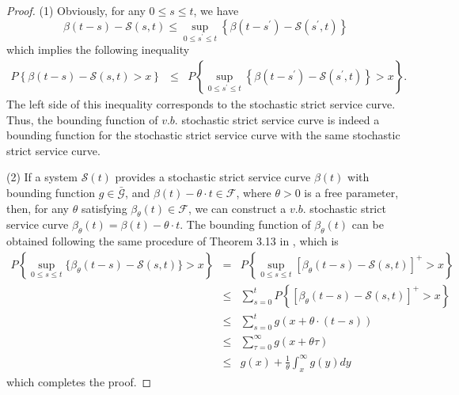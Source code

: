 \documentclass[12pt]{article}
\newtheorem{proof}{Proof}
\begin{document}
\begin{proof}
(1) Obviously, for any $0\leq s\leq t$, we have
$$\beta(t-s)-\mathcal{S}(s,t)\leq \sup_{0\leq s^\prime\leq t}\left\{\beta(t-s^\prime)-\mathcal{S}(s^\prime,t)\right\}$$
which implies the following inequality
\begin{eqnarray*}
P\left\{\beta(t-s)-\mathcal{S}(s,t)>x\right\} &\leq& P\left\{\sup_{0\leq s^\prime\leq t}\left\{\beta(t-s^\prime)-\mathcal{S}(s^\prime,t)\right\}>x\right\}.
\end{eqnarray*}
The left side of this inequality corresponds to the stochastic strict service curve. Thus, the bounding function of $v.b.$ stochastic strict service curve is indeed a bounding function for the stochastic strict service curve with the same stochastic strict service curve.

(2) If a system $\mathcal{S}(t)$ provides a stochastic strict service curve $\beta(t)$ with bounding function $g\in\bar{\mathcal{G}}$, and $\beta(t)-\theta \cdot t\in\mathcal{F}$, where $\theta>0$ is a free parameter, then, for any $\theta$ satisfying $\beta_{\theta}(t)\in\mathcal{F}$, we can construct a $v.b.$ stochastic strict service curve $\beta_{\theta}(t)=\beta(t)-\theta \cdot t$. The bounding function of $\beta_\theta(t)$ can be obtained following the same procedure of Theorem 3.13 in \cite{JiangLiu-15877}, which is
\begin{eqnarray*}
P\left\{\sup_{0\leq s\leq t}\{\beta_{\theta}(t-s)-\mathcal{S}(s,t)\}>x\right\} &= &P\left\{\sup_{0\leq s\leq t}[\beta_{\theta}(t-s)-\mathcal{S}(s,t)]^+>x\right\}\\
&\leq &\sum_{s=0}^t P\left\{[\beta_{\theta}(t-s)-\mathcal{S}(s,t)]^+>x\right\}\\
&\leq &\sum_{s=0}^t g(x+\theta\cdot(t-s))\\
&\leq & \sum_{\tau=0}^\infty g(x+\theta\tau)\\
&\leq & g(x)+\frac{1}{\theta}\int_{x}^\infty g(y)dy
\end{eqnarray*}
which completes the proof.
\end{proof}
\end{document}
